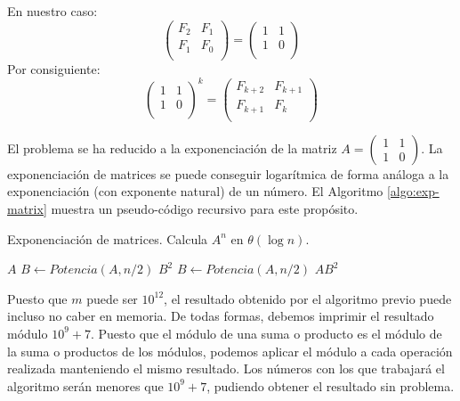 \documentclass{article}
\theoremstyle{theorem-style}  %
\theoremstyle{definition}
\theoremstyle{example-style}
\begin{document}
    En nuestro caso:
    \begin{equation}
        \begin{pmatrix}
            F_{2} & F_{1} \\
            F_{1} & F_{0} \\
        \end{pmatrix}
        =
        \begin{pmatrix}
            1 & 1 \\
            1 & 0 \\
        \end{pmatrix}        
    \end{equation}
    Por consiguiente:
    \begin{equation}
        \begin{pmatrix}
            1 & 1 \\
            1 & 0 \\
        \end{pmatrix}^k
        =
        \begin{pmatrix}
            F_{k+2} & F_{k+1} \\
            F_{k+1} & F_{k} \\
        \end{pmatrix}        
    \end{equation}
    
    El problema se ha reducido a la exponenciación de la matriz $A =
    \begin{pmatrix} 
        1 & 1 \\ 
        1 & 0 
    \end{pmatrix}$. La exponenciación de matrices se puede conseguir logarítmica de forma análoga a la exponenciación (con exponente natural) de un número. El Algoritmo \ref{algo:exp-matrix} muestra un pseudo-código recursivo para este propósito.
    
    \begin{algorithm}
        \caption{Exponenciación de matrices. Calcula $A^n$ en $\theta(\log n)$.}
        \label{algo:exp-matrix}
        \begin{algorithmic}
                    \Return $A$
                    \State $B \gets Potencia(A,n/2)$
                    \State \Return $B^2$
                \Else
                    \State $B \gets Potencia(A,n/2)$
                    \State \Return $A B^2$                    
                \EndIf
            \EndFunction
        \end{algorithmic}
    \end{algorithm}

    Puesto que $m$ puede ser $10^{12}$, el resultado obtenido por el algoritmo previo puede incluso no caber en memoria. De todas formas, debemos imprimir el resultado módulo $10^9+7$. Puesto que el módulo de una suma o producto es el módulo de la suma o productos de los módulos, podemos aplicar el módulo a cada operación realizada manteniendo el mismo resultado. Los números con los que trabajará el algoritmo serán menores que $10^9+7$, pudiendo obtener el resultado sin problema.
\end{document}
